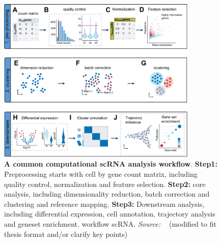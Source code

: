 \begin{figure}[!ht]
	\centering
	\includegraphics[width=0.85\textwidth]{workflow_scRNA/fig}
	\vspace{0.1cm}
	\caption[A common computational scRNA analysis workflow]{
		\textbf{A common computational scRNA analysis workflow}. 
		\textbf{Step1:} Preprocessing starts with cell by gene count matrix, including quality control, normalization and feature selection. 
		\textbf{Step2:} core analysis, including dimensionality reduction, batch correction and clustering and reference mapping.
		\textbf{Step3:} Downstream analysis, including differential expression, cell annotation, trajectory analysis and geneset enrichment.
	workflow scRNA. \emph{Source: ~\cite{heumos2023best}} (modified to fit thesis format and/or clarify key points)}
	\label{fig:workflow_scRNA}
\end{figure}

